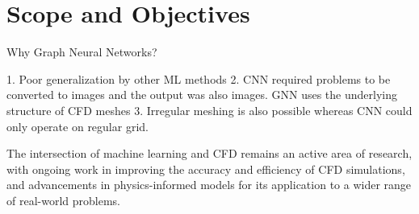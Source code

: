\section{Scope and Objectives}

Why Graph Neural Networks?

1. Poor generalization by other ML methods
2. CNN required problems to be converted to images and the output was also images. GNN uses the underlying structure of CFD meshes 
3. Irregular meshing is also possible whereas CNN could only operate on regular grid.

The intersection of machine learning and CFD remains an active area of research, with ongoing work in improving the accuracy and efficiency of CFD simulations, and advancements in physics-informed models for its application to a wider range of real-world problems.
